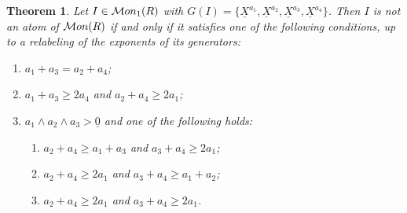 \documentclass[10pt,a4paper]{amsart}
\newtheorem{theorem}{Theorem}[section]
\providecommand\Mon{{\mathcal{M}{\rm on}}}
\begin{document}
\begin{theorem}\label{thm: 4-generated}
Let $I\in \Mon_1(R)$ with $G(I) = \{\underline X^{a_1},\underline X^{a_{2}}, \underline X^{a_3}, \underline X^{a_4}\}$. Then $I$ is not an atom of $\Mon(R)$ if and only if it satisfies one of the following conditions, up to a relabeling of the exponents of its generators:
\begin{enumerate}[label=\textup{(c\arabic{*})}, mode=unboxed]
 \item \label{mu4 c1} $a_1+a_3=a_2+a_4$; 
 \item \label{mu4 c2} $a_1+a_3\ge 2a_4$ and $a_2+a_4\ge 2a_1$; 
 \item \label{mu4 c3} $a_1\wedge a_2\wedge a_3>\underline 0$ and one of the following holds:
        \begin{enumerate}[label=\textup{(\roman{*})}, mode=unboxed]
            \item \label{mu4 c31} $a_2+a_4\ge a_1+a_3$ and $a_3+a_4\ge 2a_1$;
            \item \label{mu4 c32} $a_2+a_4\ge 2a_1$ and $a_3+a_4\ge a_1+a_2$;
            \item \label{mu4 c33} $a_2+a_4\ge 2a_1$ and $a_3+a_4\ge 2a_1$.
        \end{enumerate}
    \end{enumerate}
\end{theorem}
\end{document}
